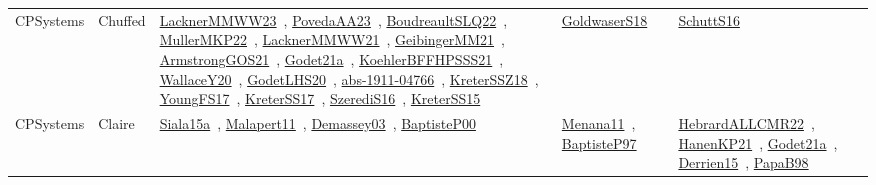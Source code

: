 {\begin{longtable}{lp{3cm}>{\raggedright\arraybackslash}p{6cm}>{\raggedright\arraybackslash}p{6cm}>{\raggedright\arraybackslash}p{8cm}}
CPSystems & Chuffed & \href{works/LacknerMMWW23.pdf}{LacknerMMWW23}~\cite{LacknerMMWW23}, \href{works/PovedaAA23.pdf}{PovedaAA23}~\cite{PovedaAA23}, \href{works/BoudreaultSLQ22.pdf}{BoudreaultSLQ22}~\cite{BoudreaultSLQ22}, \href{works/MullerMKP22.pdf}{MullerMKP22}~\cite{MullerMKP22}, \href{works/LacknerMMWW21.pdf}{LacknerMMWW21}~\cite{LacknerMMWW21}, \href{works/GeibingerMM21.pdf}{GeibingerMM21}~\cite{GeibingerMM21}, \href{works/ArmstrongGOS21.pdf}{ArmstrongGOS21}~\cite{ArmstrongGOS21}, \href{works/Godet21a.pdf}{Godet21a}~\cite{Godet21a}, \href{works/KoehlerBFFHPSSS21.pdf}{KoehlerBFFHPSSS21}~\cite{KoehlerBFFHPSSS21}, \href{works/WallaceY20.pdf}{WallaceY20}~\cite{WallaceY20}, \href{works/GodetLHS20.pdf}{GodetLHS20}~\cite{GodetLHS20}, \href{works/abs-1911-04766.pdf}{abs-1911-04766}~\cite{abs-1911-04766}, \href{works/KreterSSZ18.pdf}{KreterSSZ18}~\cite{KreterSSZ18}, \href{works/YoungFS17.pdf}{YoungFS17}~\cite{YoungFS17}, \href{works/KreterSS17.pdf}{KreterSS17}~\cite{KreterSS17}, \href{works/SzerediS16.pdf}{SzerediS16}~\cite{SzerediS16}, \href{works/KreterSS15.pdf}{KreterSS15}~\cite{KreterSS15} & \href{works/GoldwaserS18.pdf}{GoldwaserS18}~\cite{GoldwaserS18} & \href{works/SchuttS16.pdf}{SchuttS16}~\cite{SchuttS16}\\
CPSystems & Claire & \href{works/Siala15a.pdf}{Siala15a}~\cite{Siala15a}, \href{works/Malapert11.pdf}{Malapert11}~\cite{Malapert11}, \href{works/Demassey03.pdf}{Demassey03}~\cite{Demassey03}, \href{works/BaptisteP00.pdf}{BaptisteP00}~\cite{BaptisteP00} & \href{works/Menana11.pdf}{Menana11}~\cite{Menana11}, \href{works/BaptisteP97.pdf}{BaptisteP97}~\cite{BaptisteP97} & \href{works/HebrardALLCMR22.pdf}{HebrardALLCMR22}~\cite{HebrardALLCMR22}, \href{works/HanenKP21.pdf}{HanenKP21}~\cite{HanenKP21}, \href{works/Godet21a.pdf}{Godet21a}~\cite{Godet21a}, \href{works/Derrien15.pdf}{Derrien15}~\cite{Derrien15}, \href{works/PapaB98.pdf}{PapaB98}~\cite{PapaB98}\\

\end{longtable}}
